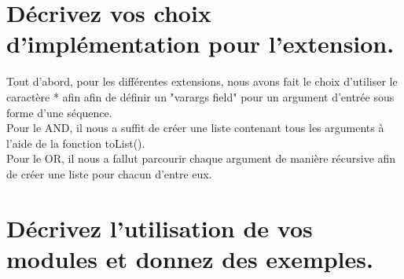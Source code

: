 \documentclass[a4paper, 11pt]{article}
\begin{document}
\section{Décrivez vos choix d’implémentation pour l’extension.}
Tout d'abord, pour les différentes extensions, nous avons fait le choix d'utiliser le caractère * afin afin de définir un "varargs field" pour un argument d'entrée sous forme d'une séquence.\\
Pour le AND, il nous a suffit de créer une liste contenant tous les arguments à l'aide de la fonction toList().\\
Pour le OR, il nous a fallut parcourir chaque argument de manière récursive afin de créer une liste pour chacun d'entre eux.

\section{Décrivez l’utilisation de vos modules et donnez des
exemples.}
\end{document}
